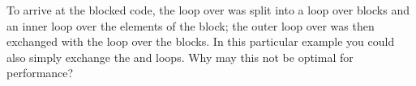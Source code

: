   To arrive at the blocked code, the loop over  was split into a
  loop over blocks and an inner loop over the elements of the block;
  the outer loop over  was then exchanged with the loop over the
  blocks. In this particular example you could also simply exchange
  the  and  loops. Why may this not be optimal for performance?
